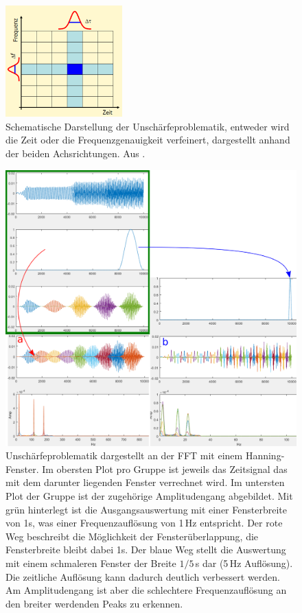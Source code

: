 \begin{figure}
	\centering
	\includegraphics[width=0.4\textwidth]{papers/wavelets/images/6-1_FFTAufloesung.png}
	\caption{Schematische Darstellung
	der Unschärfeproblematik, entweder wird die Zeit oder die
	Frequenzgenauigkeit verfeinert, dargestellt anhand der beiden
	Achsrichtungen.
	Aus \cite{wavelets:J.Mayer.2002}.
}
	\label{wavelet:fig:FFTAufloesung}
\end{figure}

\begin{figure}
	\centering
	\includegraphics[width=\textwidth]{papers/wavelets/images/6-2_AufloesungZeitVsFrequenz.png}
	\caption{Unschärfeproblematik dargestellt an der FFT mit
	einem Hanning-Fenster. Im obersten Plot pro Gruppe ist
%
	jeweils das Zeitsignal das mit dem darunter liegenden Fenster
	verrechnet wird. Im untersten Plot der Gruppe ist der
	zugehörige Amplitudengang abgebildet.
	Mit grün hinterlegt ist die Ausgangsauswertung mit einer
	Fensterbreite von 1s, was einer Frequenzauflösung von 1\,Hz
	entspricht.
	Der rote Weg beschreibt die Möglichkeit der Fensterüberlappung,
	die Fensterbreite bleibt dabei 1s.
	Der blaue Weg stellt die Auswertung mit einem schmaleren
	Fenster der Breite $1/5$\,s dar (5\,Hz Auflösung).
	Die zeitliche Auflösung kann dadurch deutlich verbessert werden.
	Am Amplitudengang ist aber die schlechtere Frequenzauflösung
	an den breiter werdenden Peaks zu erkennen.}
	\label{wavelet:fig:AufloesungZeitVsFrequenz}
\end{figure}

